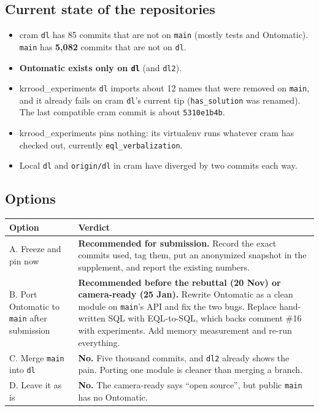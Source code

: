 \documentclass[11pt]{article}
\newcommand{\code}[1]{\texttt{#1}}
\begin{document}
\subsection{Current state of the repositories}
\begin{itemize}
  \item cram \code{dl} has 85 commits that are not on \code{main} (mostly tests and Ontomatic). \code{main} has \textbf{5,082} commits that are not on \code{dl}.
  \item \textbf{Ontomatic exists only on \code{dl}} (and \code{dl2}).
  \item krrood\_experiments \code{dl} imports about 12 names that were removed on \code{main}, and it already fails on cram \code{dl}'s current tip (\code{has\_solution} was renamed). The last compatible cram commit is about \code{5310e1b4b}.
  \item krrood\_experiments pins nothing: its virtualenv runs whatever cram has checked out, currently \code{eql\_verbalization}.
  \item Local \code{dl} and \code{origin/dl} in cram have diverged by two commits each way.
\end{itemize}

\subsection{Options}
\begin{center}\small
\begin{tabularx}{\linewidth}{@{}>{\raggedright\arraybackslash}p{3.4cm} X@{}}
\toprule
Option & Verdict\\
\midrule
A. Freeze and pin now & \textbf{Recommended for submission.} Record the exact commits used, tag them, put an anonymized snapshot in the supplement, and report the existing numbers.\\
\addlinespace
B. Port Ontomatic to \code{main} after submission & \textbf{Recommended before the rebuttal (20 Nov) or camera-ready (25 Jan).} Rewrite Ontomatic as a clean module on \code{main}'s API and fix the two bugs. Replace hand-written SQL with EQL-to-SQL, which backs comment \#16 with experiments. Add memory measurement and re-run everything.\\
\addlinespace
C. Merge \code{main} into \code{dl} & \textbf{No.} Five thousand commits, and \code{dl2} already shows the pain. Porting one module is cleaner than merging a branch.\\
\addlinespace
D. Leave it as is & \textbf{No.} The camera-ready says ``open source'', but public \code{main} has no Ontomatic.\\
\bottomrule
\end{tabularx}
\end{center}
\end{document}

